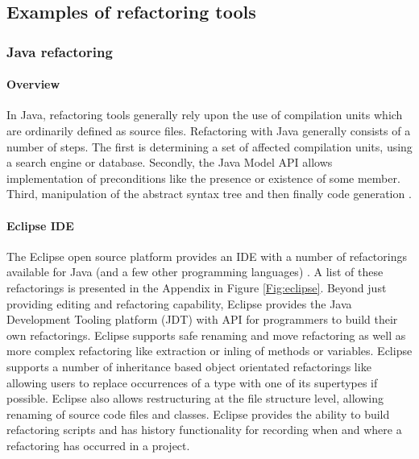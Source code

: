 \subsection{Examples of refactoring tools}\label{S:exback}


\subsubsection{Java refactoring}
\paragraph{Overview}
In Java, refactoring tools generally rely upon the use of compilation units which are ordinarily defined as source files. Refactoring with Java generally consists of a number of steps. The first is determining a set of affected compilation units, using a search engine or database. Secondly, the Java Model API allows implementation of preconditions like the presence or existence of some member. Third, manipulation of the abstract syntax tree and then finally code generation \cite{baumer2001integrating}. 

\paragraph{Eclipse IDE}
The Eclipse open source platform provides an IDE with a number of refactorings available for Java (and a few other programming languages) \cite{widmer07}. A list of these refactorings is presented in the Appendix in Figure \ref{Fig:eclipse}. Beyond just providing editing and refactoring capability, Eclipse provides the Java Development Tooling platform (JDT) with API for programmers to build their own refactorings. Eclipse supports safe renaming and move refactoring as well as more complex refactoring like extraction or inling of methods or variables. Eclipse supports a number of inheritance based object orientated refactorings like allowing users to replace occurrences of a type with one of its supertypes if possible. Eclipse also allows restructuring at the file structure level, allowing renaming of source code files and classes. Eclipse provides the ability to build refactoring scripts and has history functionality for recording when and where a refactoring has occurred in a project. 


